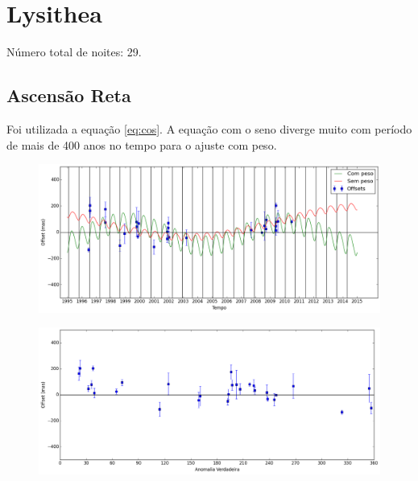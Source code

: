 \documentclass[11pt,a4paper]{report}
\begin{document}
\chapter*{Lysithea}

\indent \indent Número total de noites: 29.

\section*{Ascensão Reta}

Foi utilizada a equação \ref{eq:cos}. A equação com o seno diverge muito com período de mais de 400 anos no tempo para o ajuste com peso.

\begin{figure}[h]
\includegraphics[scale=0.45]{Lysithea/RA.png} 
\end{figure}

\begin{figure}[h]
\includegraphics[scale=0.45]{Lysithea/RA_anom.png}  
\end{figure}
\end{document}
